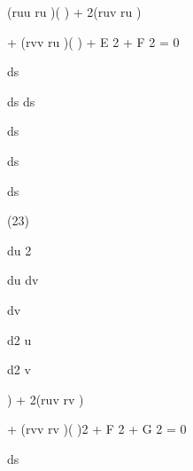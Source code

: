 \documentclass[a4paper,portrait,12pt]{article}
\begin{document}
\begin{flushleft}
(ruu ru )( ) + 2(ruv ru )
\end{flushleft}


\begin{flushleft}
+ (rvv ru )( ) + E 2 + F 2 = 0
\end{flushleft}


\begin{flushleft}
ds
\end{flushleft}


\begin{flushleft}
ds ds
\end{flushleft}


\begin{flushleft}
ds
\end{flushleft}


\begin{flushleft}
ds
\end{flushleft}


\begin{flushleft}
ds
\end{flushleft}





(23)





\begin{flushleft}
du 2
\end{flushleft}


\begin{flushleft}
du dv
\end{flushleft}


\begin{flushleft}
dv
\end{flushleft}


\begin{flushleft}
d2 u
\end{flushleft}


\begin{flushleft}
d2 v
\end{flushleft}


\begin{flushleft}
) + 2(ruv rv )
\end{flushleft}


\begin{flushleft}
+ (rvv rv )( )2 + F 2 + G 2 = 0
\end{flushleft}


\begin{flushleft}
ds
\end{flushleft}
\end{document}
